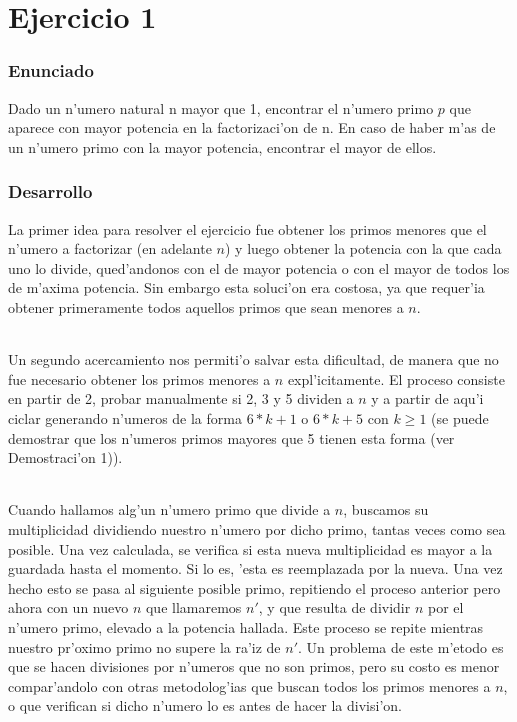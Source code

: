 \part{Ejercicio 1}
\section{Enunciado}
Dado un n'umero natural n mayor que 1, encontrar el n'umero primo $p$ que aparece con mayor potencia en la factorizaci'on 
de n. En caso de haber m'as de un n'umero primo con  la mayor potencia, encontrar el mayor de ellos.

\section{Desarrollo}
La primer idea para resolver el ejercicio fue obtener los primos menores que el n'umero a factorizar
(en adelante $n$) y luego obtener la potencia con la que cada uno lo divide, qued'andonos con el de mayor
potencia o con el mayor de todos los de m'axima potencia. Sin embargo esta soluci'on era costosa, ya que
requer'ia obtener primeramente todos aquellos primos que sean menores a $n$.
\paragraph{}
Un segundo acercamiento nos permiti'o salvar esta dificultad, de manera que no fue necesario obtener 
los primos menores a $n$ expl'icitamente. El proceso consiste en partir de 2, probar manualmente si 2, 3 y 5 
dividen a $n$ y a partir  de aqu'i ciclar generando n'umeros de la forma $6*k + 1$ o $6*k + 5$ con $k \geq 1$ 
(se puede demostrar que los n'umeros primos mayores que 5 tienen esta forma (ver Demostraci'on 1)).
\paragraph{}
Cuando hallamos alg'un n'umero primo que divide a $n$, buscamos su multiplicidad dividiendo nuestro n'umero 
por dicho primo, tantas veces como sea posible. Una vez calculada, se verifica si esta nueva multiplicidad 
es mayor a la guardada hasta el momento. Si lo es, 'esta es reemplazada por la nueva. Una vez hecho esto 
se pasa al siguiente posible primo, repitiendo el proceso anterior pero ahora con un nuevo $n$ que llamaremos 
$n'$, y que resulta de dividir $n$ por el n'umero primo, elevado a la potencia hallada. Este proceso se repite 
mientras nuestro pr'oximo primo no supere la ra'iz de $n'$. Un problema de este m'etodo es que se hacen 
divisiones por n'umeros que no son primos, pero su costo es menor compar'andolo con otras metodolog'ias que
buscan todos los primos menores a $n$, o que verifican si dicho n'umero lo es antes de hacer la divisi'on.
